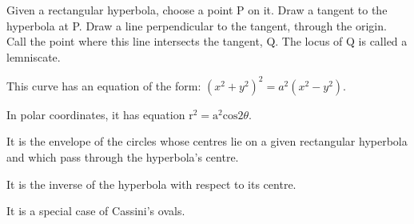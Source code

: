 Given a rectangular hyperbola, choose a point P on it. Draw a tangent to the hyperbola
at P. Draw a line perpendicular to the tangent, through the origin. Call the point
where this line intersects the tangent, Q. The locus of Q is called a lemniscate.
\par
This curve has an equation of the form: $(x^{2}+y^{2})^{2}=a^{2}(x^{2}-y^{2}).$ 
\par
In polar coordinates, it has equation 
$ \mathrm{r}^2 = \mathrm{a}^2 \mathrm{cos}2 \theta. $
\par
It is the envelope of the circles whose centres lie on a given 
rectangular hyperbola and which pass through the hyperbola's centre.
\par
It is the inverse of the hyperbola with respect to its centre.
\par
It is a special
case of Cassini's ovals.